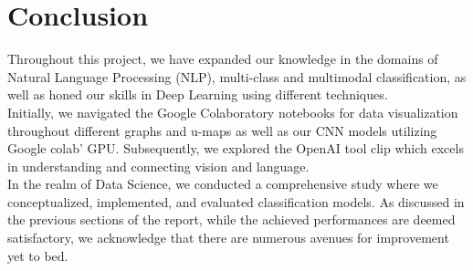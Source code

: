 \chapter{Conclusion}
\label{sec:conclusion}

Throughout this project, we have expanded our knowledge in the domains of Natural Language Processing (NLP), multi-class and multimodal classification, as well as honed our skills in Deep Learning using different techniques. \\

Initially, we navigated the Google Colaboratory notebooks for data visualization throughout  different graphs and u-maps as well as our CNN models utilizing Google colab' GPU. Subsequently, we explored the OpenAI tool clip which excels in understanding and connecting vision and language. \\

In the realm of Data Science, we conducted a comprehensive study where we conceptualized, implemented, and evaluated classification models. As discussed in the previous sections of the report, while the achieved performances are deemed satisfactory, we acknowledge that there are numerous avenues for improvement yet to bed.
